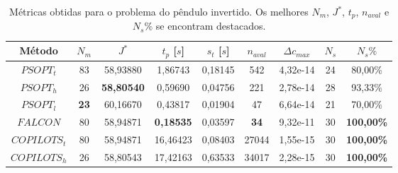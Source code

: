 \begin{table}[!h]
	\centering
	\caption[Métricas  obtidas  para  o  problema  do pêndulo invertido]{Métricas  obtidas  para  o  problema  do pêndulo invertido. Os melhores $ N_m $, $ J^* $, $ t_p $, $ n_{aval} $ e $ N_s\% $ se encontram destacados.}
	\label{tab:penduloInvertido:raw}
	\begin{tabular}{@{}ccccccccc@{}}
		\toprule
		Método       & $N_m$                              & $J^*$                                    & $t_p$ {[}$s${]}                         & $s_t$ {[}$s${]} & $n_{aval}$                         & $\Delta c_{max}$                         & $N_s$ & $N_s\%$                                  \\ \midrule
		$PSOPT_t$    & 83                                 & 58,93880                                 & 1,86743                                 & 0,18145         & 542                                & 4,32e-14                                 & 24    & 80,00\%                                  \\
		$PSOPT_h$    & 26                                 & {\color[HTML]{009901} \textbf{58,80540}} & 0,59690                                 & 0,04756         & 221                                & 2,78e-14                                 & 28    & 93,33\%                                  \\
		$PSOPT_l$    & {\color[HTML]{009901} \textbf{23}} & 60,16670                                 & 0,43817                                 & 0,01904         & 47                                 & 6,64e-14                                 & 21    & 70,00\%                                  \\
		$FALCON$     & 80                                 & 58,94871                                 & {\color[HTML]{009901} \textbf{0,18535}} & 0,03597         & {\color[HTML]{009901} \textbf{34}} & 9,32e-11                                 & 30    & {\color[HTML]{009901} \textbf{100,00\%}} \\
		$COPILOTS_t$ & 80                                 & 58,94871                                 & 16,46423                                & 0,08403         & 27044                              & 1,55e-15 & 30    & {\color[HTML]{009901} \textbf{100,00\%}} \\
		$COPILOTS_h$ & 26                                 & 58,80543                                 & 17,42163                                & 0,63533         & 34017                              & 2,28e-15                                 & 30    & {\color[HTML]{009901} \textbf{100,00\%}} \\ \bottomrule
	\end{tabular}
\end{table}